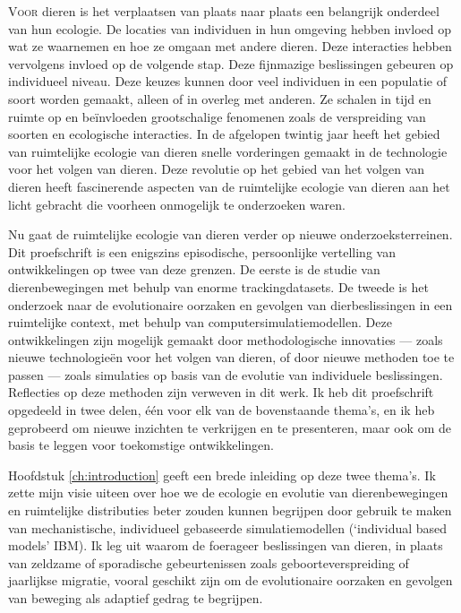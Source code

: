 
\label{ch:dutchabstract}

\lettrine{V}{oor} dieren is het verplaatsen van plaats naar plaats een belangrijk onderdeel van hun ecologie. 
De locaties van individuen in hun omgeving hebben invloed op wat ze waarnemen en hoe ze omgaan met andere dieren. Deze interacties hebben vervolgens invloed op de volgende stap. Deze fijnmazige beslissingen gebeuren op individueel niveau. Deze keuzes kunnen door veel individuen in een populatie of soort worden gemaakt, alleen of in overleg met anderen. Ze schalen in tijd en ruimte op en be{\"i}nvloeden grootschalige fenomenen zoals de verspreiding van soorten en ecologische interacties. In de afgelopen twintig jaar heeft het gebied van ruimtelijke ecologie van dieren snelle vorderingen gemaakt in de technologie voor het volgen van dieren. Deze revolutie op het gebied van het volgen van dieren heeft fascinerende aspecten van de ruimtelijke ecologie van dieren aan het licht gebracht die voorheen onmogelijk te onderzoeken waren.

Nu gaat de ruimtelijke ecologie van dieren verder op nieuwe onderzoeksterreinen. Dit proefschrift is een enigszins episodische, persoonlijke vertelling van ontwikkelingen op twee van deze grenzen. De eerste is de studie van dierenbewegingen met behulp van enorme trackingdatasets. De tweede is het onderzoek naar de evolutionaire oorzaken en gevolgen van dierbeslissingen in een ruimtelijke context, met behulp van computersimulatiemodellen. Deze ontwikkelingen zijn mogelijk gemaakt door methodologische innovaties --- zoals nieuwe technologie{\"e}n voor het volgen van dieren, of door nieuwe methoden toe te passen --- zoals simulaties op basis van de evolutie van individuele beslissingen. Reflecties op deze methoden zijn verweven in dit werk. Ik heb dit proefschrift opgedeeld in twee delen, {\'e}{\'e}n voor elk van de bovenstaande thema's, en ik heb geprobeerd om nieuwe inzichten te verkrijgen en te presenteren, maar ook om de basis te leggen voor toekomstige ontwikkelingen.

Hoofdstuk \ref{ch:introduction} geeft een brede inleiding op deze twee thema's. Ik zette mijn visie uiteen over hoe we de ecologie en evolutie van dierenbewegingen en ruimtelijke distributies beter zouden kunnen begrijpen door gebruik te maken van mechanistische, individueel gebaseerde simulatiemodellen (`individual based models' IBM). Ik leg uit waarom de foerageer beslissingen van dieren, in plaats van zeldzame of sporadische gebeurtenissen zoals geboorteverspreiding of jaarlijkse migratie, vooral geschikt zijn om de evolutionaire oorzaken en gevolgen van beweging als adaptief gedrag te begrijpen.

